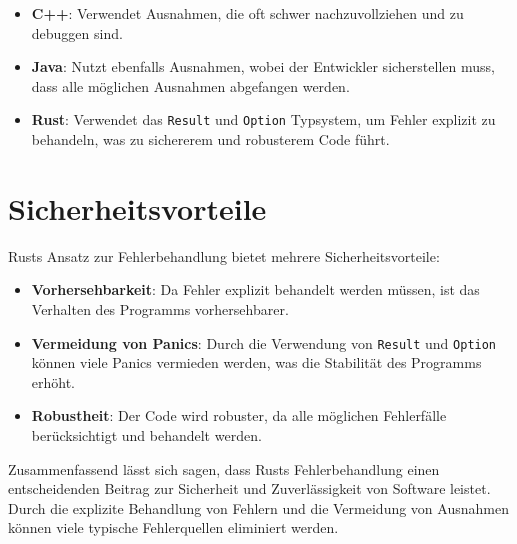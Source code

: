 \begin{itemize}
    \item \textbf{C++}: Verwendet Ausnahmen, die oft schwer nachzuvollziehen und zu debuggen sind.
    \item \textbf{Java}: Nutzt ebenfalls Ausnahmen, wobei der Entwickler sicherstellen muss, dass alle möglichen Ausnahmen abgefangen werden.
    \item \textbf{Rust}: Verwendet das \texttt{Result} und \texttt{Option} Typsystem, um Fehler explizit zu behandeln, was zu sichererem und robusterem Code führt.
\end{itemize}

\section{Sicherheitsvorteile}
Rusts Ansatz zur Fehlerbehandlung bietet mehrere Sicherheitsvorteile:

\begin{itemize}
    \item \textbf{Vorhersehbarkeit}: Da Fehler explizit behandelt werden müssen, ist das Verhalten des Programms vorhersehbarer.
    \item \textbf{Vermeidung von Panics}: Durch die Verwendung von \texttt{Result} und \texttt{Option} können viele Panics vermieden werden, was die Stabilität des Programms erhöht.
    \item \textbf{Robustheit}: Der Code wird robuster, da alle möglichen Fehlerfälle berücksichtigt und behandelt werden.
\end{itemize}
\noindent
Zusammenfassend lässt sich sagen, dass Rusts Fehlerbehandlung einen entscheidenden Beitrag zur Sicherheit und Zuverlässigkeit von Software leistet. Durch die explizite Behandlung von Fehlern und die Vermeidung von Ausnahmen können viele typische Fehlerquellen eliminiert werden.


